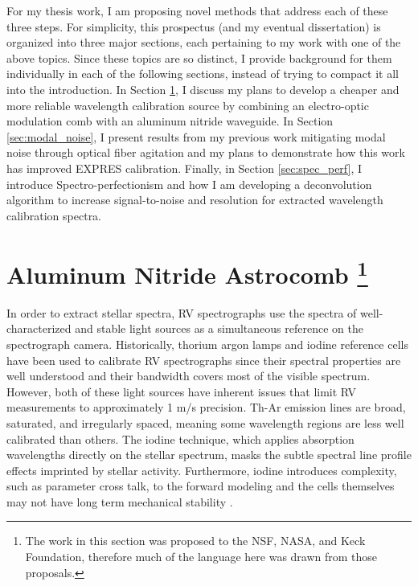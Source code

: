 \documentclass[11pt]{article}
\begin{document}
For my thesis work, I am proposing novel methods that address each of these three steps. For simplicity, this prospectus (and my eventual dissertation) is organized into three major sections, each pertaining to my work with one of the above topics. Since these topics are so distinct, I provide background for them individually in each of the following sections, instead of trying to compact it all into the introduction. In Section \ref{sec:astrocomb}, I discuss my plans to develop a cheaper and more reliable wavelength calibration source by combining an electro-optic modulation comb with an aluminum nitride waveguide. In Section \ref{sec:modal_noise}, I present results from my previous work mitigating modal noise through optical fiber agitation and my plans to demonstrate how this work has improved EXPRES calibration. Finally, in Section \ref{sec:spec_perf}, I introduce Spectro-perfectionism and how I am developing a deconvolution algorithm to increase signal-to-noise and resolution for extracted wavelength calibration spectra.

\section{Aluminum Nitride Astrocomb \footnote{The work in this section was proposed to the NSF, NASA, and Keck Foundation, therefore much of the language here was drawn from those proposals.}}
\label{sec:astrocomb}

In order to extract stellar spectra, RV spectrographs use the spectra of well-characterized and stable light sources as a simultaneous reference on the spectrograph camera. Historically, thorium argon lamps and iodine reference cells have been used to calibrate RV spectrographs since their spectral properties are well understood and their bandwidth covers most of the visible spectrum. However, both of these light sources have inherent issues that limit RV measurements to approximately 1 m/s precision. Th-Ar emission lines are broad, saturated, and irregularly spaced, meaning some wavelength regions are less well calibrated than others. The iodine technique, which applies absorption wavelengths directly on the stellar spectrum, masks the subtle spectral line profile effects imprinted by stellar activity. Furthermore, iodine introduces complexity, such as parameter cross talk, to the forward modeling \citep{Spronck2015} and the cells themselves may not have long term mechanical stability \citep{Fischer2014a}.
\end{document}
